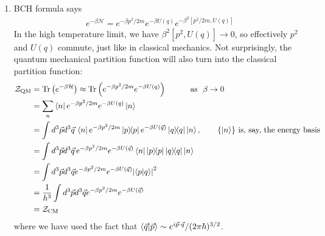 \documentclass{article}
\theoremstyle{definition}
\newcommand{\ham}{\mathcal{H}}
\newcommand{\be}{\beta}
\newcommand{\f}[2]{\frac{#1}{#2}}
\newcommand{\lp}{\left(}
\newcommand{\rp}{\right)}
\begin{document}
\begin{enumerate}[label=(\alph*)]
	\item BCH formula says
	\begin{align*}
	e^{-\be \ham} = e^{-\be p^2/2m} e^{-\be U({q})} e^{-\be^2 [p^2/2m, U({q})]} 
	\end{align*}
	In the high temperature limit, we have $\be^2 [p^2, U({q})] \to 0$, so effectively $p^2$ and $U({q})$ commute, just like in classical mechanics. Not surprisingly, the quantum mechanical partition function will also turn into the classical partition function:
	\begin{align*}
	\mathcal{Z}_\text{QM} 
	&= \Tr\lp e^{-\be \ham}  \rp \approx  \Tr\lp e^{-\be p^2/2m} e^{-\be U({q})} \rp\quad\quad\quad \text{as  }\,\,\be \to 0 \\
	&= \sum_{n}\bra{n} e^{-\be p^2/2m} e^{-\be U({q})} \ket{{n}}\\
	&= \int d^3  \vec{p} d^3 \vec{q} \, \bra{n}e^{-\be p^2/2m} \ketbra{p}  e^{-\be U(\vec{q})} \ketbra{q} \ket{n},\quad\quad \{ \ket{n} \}\text{ is, say, the energy basis}\\
	&= \int d^3  \vec{p} d^3 \vec{q} \,
	e^{-\be p^2/2m} e^{-\be U(\vec{q})} \bra{n}\ketbra{p}   \ketbra{q} \ket{n}\\
	&= \int d^3  \vec{p} d^3 \vec{q}  e^{-\be p^2/2m}  e^{-\be U(\vec{q})} \abs{\bra{p}\ket{q}}^2\\
	&= \f{1}{h^3}\int d^3  \vec{p} d^3 \vec{q}  e^{-\be p^2/2m}  e^{-\be U(\vec{q})}\\
	&= \mathcal{Z}_\text{CM}
	\end{align*}
	where we have used the fact that $\bra{\vec{q}}\ket{\vec{p}} \sim e^{i \vec{p}\cdot \vec{q}}/(2\pi \hbar)^{3/2}       $. 
	

\end{enumerate}
\end{document}
